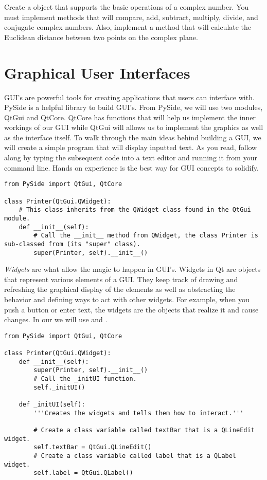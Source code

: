 \begin{problem}
Create a  object that supports the basic operations of a complex number.
You must implement methods that will compare, add, subtract, multiply, divide, and conjugate complex numbers.
Also, implement a  method that will calculate the Euclidean distance between two points on the complex plane.
\label{prob:complexNum}
\end{problem}

\section*{Graphical User Interfaces}

GUI's are powerful tools for creating applications that users can interface with.
PySide is a helpful library to build GUI's.
From PySide, we will use two modules, QtGui and QtCore.
QtCore has functions that will help us implement the inner workings of our GUI while QtGui will allows us to implement the graphics as well as the interface itself.
To walk through the main ideas behind building a GUI, we will create a simple program that will display inputted text. As you read, follow along by typing the subsequent code into a text editor and running it from your command line. Hands on experience is the best way for GUI concepts to solidify.

\begin{lstlisting}
from PySide import QtGui, QtCore

class Printer(QtGui.QWidget):
	# This class inherits from the QWidget class found in the QtGui module.
	def __init__(self):
		# Call the __init__ method from QWidget, the class Printer is sub-classed from (its "super" class).
		super(Printer, self).__init__()

\end{lstlisting}

\emph{Widgets} are what allow the magic to happen in GUI's.
Widgets in Qt are objects that represent various elements of a GUI.
They keep track of drawing and refreshing the graphical display of the elements as well as abstracting the behavior and defining ways to act with other widgets.
For example, when you push a button or enter text, the widgets are the objects that realize it and cause changes.
In our  we will use  and .

\begin{lstlisting}
from PySide import QtGui, QtCore

class Printer(QtGui.QWidget):
	def __init__(self):
		super(Printer, self).__init__()
		# Call the _initUI function.
		self._initUI()
	
	def _initUI(self):
		'''Creates the widgets and tells them how to interact.'''
		
		# Create a class variable called textBar that is a QLineEdit widget.
		self.textBar = QtGui.QLineEdit()
		# Create a class variable called label that is a QLabel widget.
		self.label = QtGui.QLabel()

\end{lstlisting}

